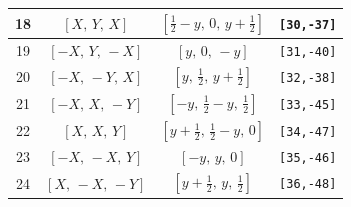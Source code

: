 \documentclass[fleqn,8pt]{jsarticle}
\begin{document}
\begin{longtable}{cccc}
18 & $\left[ X,\, Y,\, X \right]$ & $\left[ \frac{1}{2} - y,\, 0,\, y + \frac{1}{2} \right]$ & {\tt [30,-37]} \\ \hline
19 & $\left[ - X,\, Y,\, - X \right]$ & $\left[ y,\, 0,\, - y \right]$ & {\tt [31,-40]} \\ \hline
20 & $\left[ - X,\, - Y,\, X \right]$ & $\left[ y,\, \frac{1}{2},\, y + \frac{1}{2} \right]$ & {\tt [32,-38]} \\ \hline
21 & $\left[ - X,\, X,\, - Y \right]$ & $\left[ - y,\, \frac{1}{2} - y,\, \frac{1}{2} \right]$ & {\tt [33,-45]} \\ \hline
22 & $\left[ X,\, X,\, Y \right]$ & $\left[ y + \frac{1}{2},\, \frac{1}{2} - y,\, 0 \right]$ & {\tt [34,-47]} \\ \hline
23 & $\left[ - X,\, - X,\, Y \right]$ & $\left[ - y,\, y,\, 0 \right]$ & {\tt [35,-46]} \\ \hline
24 & $\left[ X,\, - X,\, - Y \right]$ & $\left[ y + \frac{1}{2},\, y,\, \frac{1}{2} \right]$ & {\tt [36,-48]} \\
\end{longtable}
\renewcommand{\arraystretch}{1.2}
\end{document}
